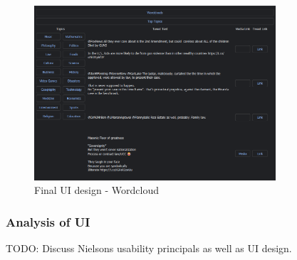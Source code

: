 \begin{figure}[h]
    \centering
    \includegraphics[width=0.8\textwidth]{../images/UI-dark-1-ft.png}
    \caption{Final UI design - Wordcloud}
    \label{fig:ui-findtopics}
\end{figure}

\subsubsection{Analysis of UI}
TODO: Discuss Nielsons usability principals as well as UI design.

